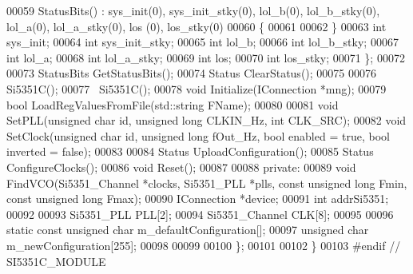 \begin{DoxyCode}
00059         StatusBits() : sys\_init(0), sys\_init\_stky(0), lol\_b(0), lol\_b\_stky(0), lol\_a(0), lol\_a\_stky(0), los
      (0), los\_stky(0)
00060         \{
00061 
00062         \}
00063         \textcolor{keywordtype}{int} sys_init;
00064         \textcolor{keywordtype}{int} sys_init_stky;
00065         \textcolor{keywordtype}{int} lol_b;
00066         \textcolor{keywordtype}{int} lol_b_stky;
00067         \textcolor{keywordtype}{int} lol_a;
00068         \textcolor{keywordtype}{int} lol_a_stky;
00069         \textcolor{keywordtype}{int} los;
00070         \textcolor{keywordtype}{int} los_stky;
00071     \};
00072 
00073     StatusBits GetStatusBits();
00074     Status ClearStatus();
00075 
00076     Si5351C();
00077     ~Si5351C();
00078     \textcolor{keywordtype}{void} Initialize(IConnection *mng);
00079     \textcolor{keywordtype}{bool} LoadRegValuesFromFile(std::string FName);
00080 
00081     \textcolor{keywordtype}{void} SetPLL(\textcolor{keywordtype}{unsigned} \textcolor{keywordtype}{char} \textcolor{keywordtype}{id}, \textcolor{keywordtype}{unsigned} \textcolor{keywordtype}{long} CLKIN\_Hz, \textcolor{keywordtype}{int} CLK\_SRC);
00082     \textcolor{keywordtype}{void} SetClock(\textcolor{keywordtype}{unsigned} \textcolor{keywordtype}{char} \textcolor{keywordtype}{id}, \textcolor{keywordtype}{unsigned} \textcolor{keywordtype}{long} fOut\_Hz, \textcolor{keywordtype}{bool} enabled = \textcolor{keyword}{true}, \textcolor{keywordtype}{bool} 
      inverted = \textcolor{keyword}{false});
00083 
00084     Status UploadConfiguration();
00085     Status ConfigureClocks();
00086     \textcolor{keywordtype}{void} Reset();
00087 
00088 \textcolor{keyword}{private}:
00089     \textcolor{keywordtype}{void} FindVCO(Si5351_Channel *clocks, Si5351_PLL *plls, \textcolor{keyword}{const} \textcolor{keywordtype}{unsigned} \textcolor{keywordtype}{long} Fmin, \textcolor{keyword}{const} \textcolor{keywordtype}{unsigned} \textcolor{keywordtype}{long} 
      Fmax);
00090     IConnection *device;
00091     \textcolor{keywordtype}{int} addrSi5351;
00092 
00093     Si5351_PLL PLL[2];
00094     Si5351_Channel CLK[8];
00095 
00096     \textcolor{keyword}{static} \textcolor{keyword}{const} \textcolor{keywordtype}{unsigned} \textcolor{keywordtype}{char} m\_defaultConfiguration[];
00097     \textcolor{keywordtype}{unsigned} \textcolor{keywordtype}{char} m\_newConfiguration[255];
00098 
00099 
00100 \};
00101 
00102 \}
00103 \textcolor{preprocessor}{#endif // SI5351C\_MODULE}
\end{DoxyCode}
